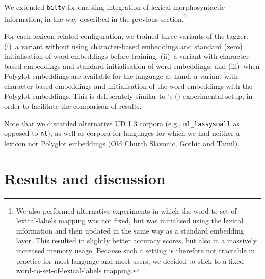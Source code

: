 \documentclass[11pt,letterpaper]{article}
\begin{document}
We extended \texttt{bilty} for enabling integration of lexical morphosyntactic information, in the way described in the
previous section.\footnote{We also performed alternative experiments in which the word-to-set-of-lexical-labels mapping
  was not fixed, but was initialised using the lexical information and then updated in the same way as a standard
  embedding layer. This resulted in slightly better accuracy scores, but also in a massively increased memory
  usage. Because such a setting is therefore not tractable in practice for most language and most users, we decided to
  stick to a fixed word-to-set-of-lexical-labels mapping.}

For each lexicon-related configuration, we trained three variants of the tagger: (i)~a variant without using
character-based embeddings and standard (zero) initialisation of word embeddings before training, (ii)~a variant with
character-based embeddings and standard initialisation of word embeddings, and (iii)~when Polyglot embeddings are
available for the language at hand, a variant with character-based embeddings and initialisation of the word embeddings
with the Polyglot embeddings. This is deliberately similar to \citeauthor{plank16}'s (\citeyear{plank16}) experimental
setup, in order to facilitate the comparison of results.

Note that we discarded alternative UD 1.3 corpora (e.g., {\tt nl\_lassysmall} as opposed to {\tt nl}), as well as
corpora for languages for which we had neither a lexicon nor Polyglot embeddings (Old Church Slavonic, Gothic and Tamil).


\section{Results and discussion}







\end{document}
